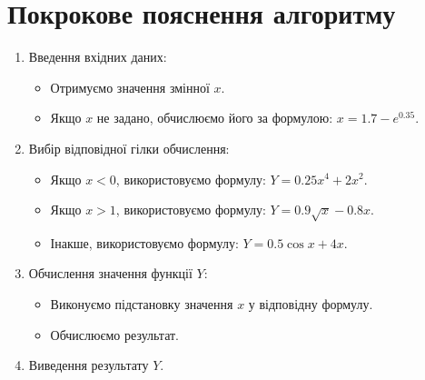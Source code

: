 \documentclass[a4paper]{article}
\begin{document}
\section*{Покрокове пояснення алгоритму}
\begin{enumerate}
    \item Введення вхідних даних:
    \begin{itemize}
        \item Отримуємо значення змінної \( x \).
        \item Якщо \( x \) не задано, обчислюємо його за формулою: \( x = 1.7 - e^{0.35} \).
    \end{itemize}
    \item Вибір відповідної гілки обчислення:
    \begin{itemize}
        \item Якщо \( x < 0 \), використовуємо формулу: \( Y = 0.25x^4 + 2x^2 \).
        \item Якщо \( x > 1 \), використовуємо формулу: \( Y = 0.9\sqrt{x} - 0.8x \).
        \item Інакше, використовуємо формулу: \( Y = 0.5 \cos x + 4x \).
    \end{itemize}
    \newpage
    \item Обчислення значення функції \( Y \):
    \begin{itemize}
        \item Виконуємо підстановку значення \( x \) у відповідну формулу.
        \item Обчислюємо результат.
    \end{itemize}
    \item Виведення результату \( Y \).
\end{enumerate}

\end{document}
